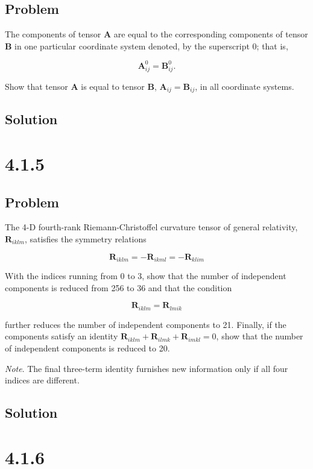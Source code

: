 \documentclass[12pt]{article}
\begin{document}
\subsection{Problem}

The components of tensor \textbf{A} are equal to the corresponding components
of tensor \textbf{B} in one particular coordinate system denoted, by the
superscript 0; that is,

\[
    \textbf{A}^0_{ij} = \textbf{B}^0_{ij}.
\]

Show that tensor \textbf{A} is equal to tensor \textbf{B},
\(\textbf{A}_{ij} = \textbf{B}_{ij}\), in all coordinate systems.

\subsection{Solution}

\section{4.1.5}

\subsection{Problem}

The 4-D fourth-rank Riemann-Christoffel curvature tensor of general relativity,
\(\textbf{R}_{iklm}\), satisfies the symmetry relations

\[
    \textbf{R}_{iklm} = - \textbf{R}_{ikml} = - \textbf{R}_{klim}
\]

With the indices running from 0 to 3, show that the number of independent components
is reduced from 256 to 36 and that the condition

\[
    \textbf{R}_{iklm} = \textbf{R}_{lmik}
\]

further reduces the number of independent components to 21. Finally, if the components
satisfy an identity \(\textbf{R}_{iklm} + \textbf{R}_{ilmk} + \textbf{R}_{imkl} = 0\),
show that the number of independent components is reduced to 20.

\textit{Note}. The final three-term identity furnishes new
information only if all four indices are different.

\subsection{Solution}

\section{4.1.6}
\end{document}
